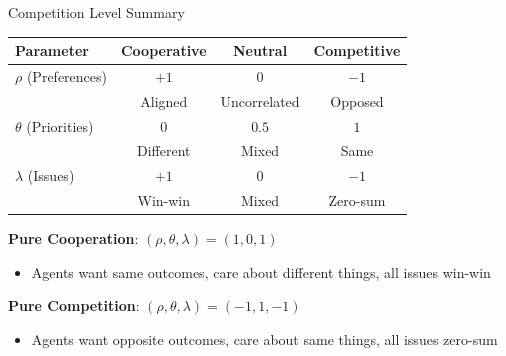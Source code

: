\documentclass{beamer}
\begin{document}
\begin{frame}{Competition Level Summary}
\begin{center}
\begin{tabular}{lccc}
\hline
\textbf{Parameter} & \textbf{Cooperative} & \textbf{Neutral} & \textbf{Competitive} \\
\hline
$\rho$ (Preferences) & $+1$ & $0$ & $-1$ \\
 & Aligned & Uncorrelated & Opposed \\
\hline
$\theta$ (Priorities) & $0$ & $0.5$ & $1$ \\
 & Different & Mixed & Same \\
\hline
$\lambda$ (Issues) & $+1$ & $0$ & $-1$ \\
 & Win-win & Mixed & Zero-sum \\
\hline
\end{tabular}
\end{center}

\vspace{0.5cm}

\textbf{Pure Cooperation}: $(\rho, \theta, \lambda) = (1, 0, 1)$
\begin{itemize}
    \item Agents want same outcomes, care about different things, all issues win-win
\end{itemize}

\vspace{0.3cm}

\textbf{Pure Competition}: $(\rho, \theta, \lambda) = (-1, 1, -1)$
\begin{itemize}
    \item Agents want opposite outcomes, care about same things, all issues zero-sum
\end{itemize}
\end{frame}
\end{document}
